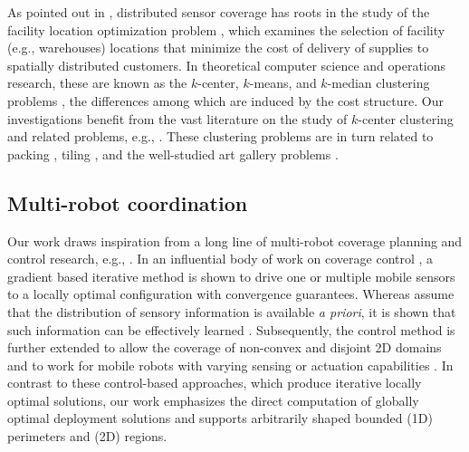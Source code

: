 As pointed out in \cite{cortes2004coverage,schwager2009decentralized}, 
distributed sensor coverage has roots in the study 
of the facility location optimization problem 
\cite{weber1929theory,drezner1995facility}, which examines the selection 
of facility (e.g., warehouses) locations that minimize the cost of delivery 
of supplies to spatially distributed customers. In theoretical computer 
science and operations research, these are known as the $k$-center, 
$k$-means, and $k$-median clustering problems \cite{har2011geometric}, 
the differences among which are induced by the cost structure. Our 
investigations benefit from the vast literature on 
the study of $k$-center clustering and related problems, e.g., 
\cite{feder1988optimal,hochbaum1985best,gonzalez1985clustering,daskin2000new,shamos1975closest}.
%
These clustering problems are in turn related to packing 
\cite{hales2005proof}, tiling \cite{thue1910dichteste}, and the 
well-studied art gallery problems \cite{o1987art,shermer1992recent}.

\subsection{Multi-robot coordination} 
Our work draws inspiration from a long line of multi-robot coverage planning and 
control research, e.g., \cite{cortes2004coverage,martinez2007motion,
schwager2009optimal,pavone2009equitable,schwager2009decentralized,
pierson2017adapting}. 
%
In an influential body of work on coverage control \cite{cortes2004coverage,
martinez2007motion}, a gradient based iterative method is shown to drive 
one or multiple mobile sensors to a locally optimal configuration with 
convergence guarantees. 
%
Whereas \cite{cortes2004coverage,martinez2007motion} assume that the 
distribution of sensory information is available {\em a priori}, it is 
shown that such information can be effectively learned 
\cite{schwager2009decentralized}. 
%
Subsequently, the control method is further extended to allow the 
coverage of non-convex and disjoint 2D domains \cite{schwager2009optimal} 
and to work for mobile robots with varying sensing or actuation capabilities
\cite{pierson2017adapting}. 
%
In contrast to these control-based approaches, which produce iterative 
locally optimal solutions, our work emphasizes the direct computation of 
globally optimal deployment solutions and supports arbitrarily shaped
bounded (1D) perimeters and (2D) regions.

